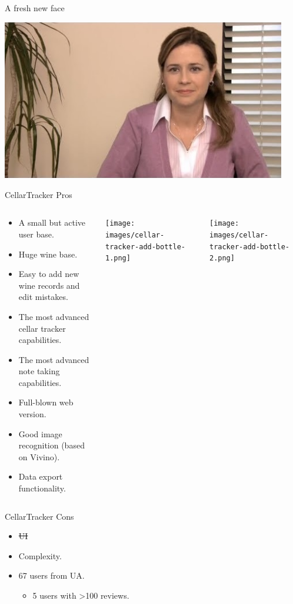 \documentclass[presentation,aspectratio=169,smaller]{beamer}
\begin{document}
\begin{frame}[label={sec:orgfc551d2}]{A fresh new face}
\begin{center}
\includegraphics[height=7.0cm]{images/theare-the-same.jpeg}
\end{center}
\end{frame}
\begin{frame}[label={sec:orgb0d91c3}]{CellarTracker Pros}
\begin{columns}
\begin{column}{0.5\columnwidth}
\begin{itemize}
\item A small but active user base.
\item Huge wine base.
\item Easy to add new wine records and edit mistakes.
\item The most advanced cellar tracker capabilities.
\item The most advanced note taking capabilities.
\item Full-blown web version.
\item Good image recognition (based on Vivino).
\item Data export functionality.
\end{itemize}
\end{column}
\begin{column}{0.25\columnwidth}
\begin{center}
\texttt{[image: images/cellar-tracker-add-bottle-1.png]}
\end{center}
\end{column}
\begin{column}{0.25\columnwidth}
\begin{center}
\texttt{[image: images/cellar-tracker-add-bottle-2.png]}
\end{center}
\end{column}
\end{columns}
\end{frame}
\begin{frame}[label={sec:org0d1a727}]{CellarTracker Cons}
\begin{itemize}
\item \sout{UI}
\item Complexity.
\item 67 users from UA.
\begin{itemize}
\item 5 users with >100 reviews.
\end{itemize}
\end{itemize}
\end{frame}
\end{document}
